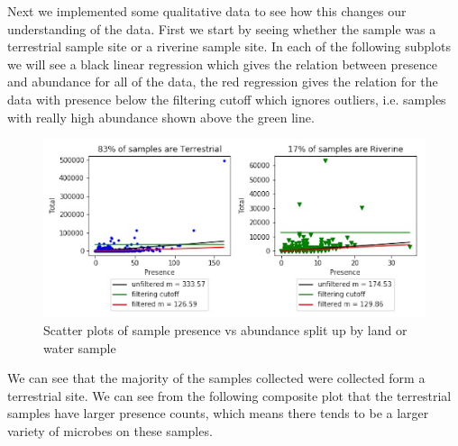 \documentclass{article}
\theoremstyle{definition} \newtheorem*{lte}{Definition}
\theoremstyle{plain} \newtheorem*{csbt}{Theorem}
\begin{document}
Next we implemented some qualitative data to see how this changes our understanding of the data. First we start by seeing whether the sample was a terrestrial sample site or a riverine sample site. In each of the following subplots  we will see a black linear regression which gives the relation between presence and abundance for all of the data, the red regression gives the relation for the data with presence below the filtering cutoff which ignores outliers, i.e. samples with really high abundance shown above the green line. 
\begin{figure}[H]
\begin{center}
  \includegraphics[width=.8\linewidth]{habitat.png}
  \caption{ Scatter plots of sample presence vs abundance split up by land or water sample} 
  \label{fig:habitat}
  \end{center}
\end{figure}

We can see that the majority of the samples collected were collected form a terrestrial site. We can see from the following composite plot that the terrestrial samples have larger presence counts, which means there tends to be a larger variety of microbes on these samples. 
 
 
 
\end{document}
